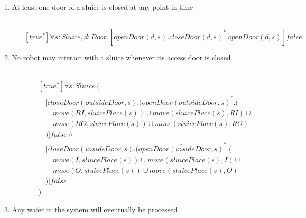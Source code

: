 
\newcommand{\tab}{\hspace{1em}}

\begin{description}
 \item[1. At least one door of a sluice is closed at any point in time]\mbox{}\\
\[
[true^*]\forall s:Sluice,d:Door.[openDoor(d, s).\overline{closeDoor(d, s)}^*.openDoor(d, s)]false
\]


 \item[2. No robot may interact with a sluice whenever its access door is closed]\mbox{}\\
\begin{align*}
& [true^*]\forall s:Sluice.( \\
& \tab [closeDoor(outsideDoor, s).(\overline{openDoor(outsideDoor, s)}^*.( \\
& \tab\tab move(RI, sluicePlace(s)) \cup move(sluicePlace(s), RI) \cup \\
& \tab\tab move(RO, sluicePlace(s)) \cup move(sluicePlace(s), RO) \\
& \tab )]false \wedge \\
& \tab [closeDoor(insideDoor, s).(\overline{openDoor(insideDoor, s)}^*.( \\
& \tab\tab move(I, sluicePlace(s)) \cup move(sluicePlace(s), I) \cup \\
& \tab\tab move(O, sluicePlace(s)) \cup move(sluicePlace(s), O) \\
& \tab )]false \\
& )
\end{align*}
 
 \item[3. Any wafer in the system will eventually be processed]


\end{description}

